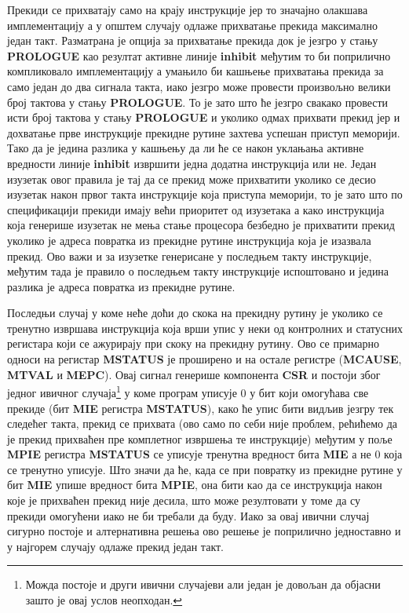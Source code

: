 Прекиди се прихватају само на крају инструкције јер то значајно олакшава имплементацију а у општем случају одлаже прихватање прекида максимално један такт.
Разматрана је опција за прихватање прекида док је језгро у стању \textbf{PROLOGUE} као резултат активне линије \textbf{inhibit} међутим то би поприлично компликовало имплементацију а умањило би кашњење прихватања прекида за само један до два сигнала такта, иако језгро може провести произвољно велики број тактова у стању \textbf{PROLOGUE}. То је зато што ће језгро свакако провести исти број тактова у стању \textbf{PROLOGUE} и уколико одмах прихвати прекид јер и дохватање прве инструкције прекидне рутине захтева успешан приступ меморији. Тако да је једина разлика у кашњењу да ли ће се након уклањања активне вредности линије \textbf{inhibit} извршити једна додатна инструкција или не. Један изузетак овог правила је тај да се прекид може прихватити уколико се десио изузетак након првог такта инструкције која приступа меморији, то је зато што по спецификацији прекиди имају већи приоритет од изузетака а како инструкција која генерише изузетак не мења стање процесора безбедно је прихватити прекид уколико је адреса повратка из прекидне рутине инструкција која је изазвала прекид. Ово важи и за изузетке генерисане у последњем такту инструкције, међутим тада је правило о последњем такту инструкције испоштовано и једина разлика је адреса повратка из прекидне рутине.

Последњи случај у коме неће доћи до скока на прекидну рутину је уколико се тренутно извршава инструкција која врши упис у неки од контролних и статусних регистара који се ажурирају при скоку на прекидну рутину. Ово се примарно односи на регистар \textbf{\acrshort{MSTATUS}} је проширено и на остале регистре (\textbf{\acrshort{MCAUSE}}, \textbf{\acrshort{MTVAL}} и \textbf{\acrshort{MEPC}}). Овај сигнал генерише компонента \textbf{CSR} и постоји због једног ивичног случаја\footnote{Можда постоје и други ивични случајеви али један је довољан да објасни зашто је овај услов неопходан.} у коме програм уписује 0 у бит који омогућава све прекиде (бит \textbf{\acrshort{MIE}} регистра \textbf{\acrshort{MSTATUS}}), како ће упис бити видљив језгру тек следећег такта, прекид се прихвата (ово само по себи није проблем, рећићемо да је прекид прихваћен пре комплетног извршења те инструкције) међутим у поље \textbf{\acrshort{MPIE}} регистра \textbf{\acrshort{MSTATUS}} се уписује тренутна вредност бита \textbf{\acrshort{MIE}} а не 0 која се тренутно уписује. Што значи да ће, када се при повратку из прекидне рутине у бит \textbf{\acrshort{MIE}} упише вредност бита \textbf{\acrshort{MPIE}}, она бити као да се инструкција након које је прихваћен прекид није десила, што може резултовати у томе да су прекиди омогућени иако не би требали да буду. Иако за овај ивични случај сигурно постоје и алтернативна решења ово решење је поприлично једноставно и у најгорем случају одлаже прекид један такт.

